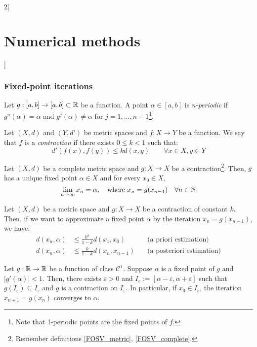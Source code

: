\documentclass[../../../main.tex]{subfiles}
\begin{document}
\begin{multicols}{2}[\section{Numerical methods}]
    \subsubsection*{Fixed-point iterations}
    \begin{definition}
        Let $g:[a,b]\rightarrow[a,b]\subset\mathbb{R}$ be a function. A point $\alpha\in[a,b]$ is \textit{n-periodic} if $g^n(\alpha)=\alpha$ and $g^j(\alpha)\ne\alpha$ for $j=1,\ldots,n-1$\footnote{Note that 1-periodic points are the fixed points of $f$.}.
    \end{definition}
    \begin{definition}
        Let $(X,d)$ and $(Y,d')$  be metric spaces and $f:X\rightarrow Y$ be a function. We say that $f$ is a \textit{contraction} if there exists $0\leq k<1$ such that: $$d'(f(x),f(y))\leq kd(x,y)\qquad\forall x\in X,y\in Y$$
    \end{definition}
    \begin{theorem}
        Let $(X,d)$ be a complete metric space and $g:X\rightarrow X$ be a contraction\footnote{Remember definitions \ref{FOSV_metric}, \ref{FOSV_complete}.}. Then, $g$ has a unique fixed point $\alpha\in X$ and for every $x_0\in X$, $$\lim_{n\to\infty}x_n=\alpha,\quad\text{where }x_n=g(x_{n-1})\quad\forall n\in\mathbb{N}$$
    \end{theorem}
    \begin{prop}
        Let $(X,d)$ be a metric space and $g:X\rightarrow X$ be a contraction of constant $k$. Then, if we want to approximate a fixed point $\alpha$ by the iteration $x_n=g(x_{n-1})$, we have:
        \begin{align*}
            d(x_n,\alpha) & \leq\frac{k^n}{1-k}d(x_1,x_0)\quad   & \text{(a priori estimation)}     \\
            d(x_n,\alpha) & \leq\frac{k}{1-k}d(x_n,x_{n-1})\quad & \text{(a posteriori estimation)}
        \end{align*}
    \end{prop}
    \begin{corollary}
        Let $g:\mathbb{R}\rightarrow\mathbb{R}$ be a function of class $\mathcal{C}^1$. Suppose $\alpha$ is a fixed point of $g$ and $|g'(\alpha)|<1$. Then, there exists $\varepsilon>0$ and $I_\varepsilon:=[\alpha-\varepsilon,\alpha+\varepsilon]$ such that $g(I_\varepsilon)\subseteq I_\varepsilon$ and $g$ is a contraction on $I_\varepsilon$. In particular, if $x_0\in I_\varepsilon$, the iteration $x_{n+1}=g(x_n)$ converges to $\alpha$.
    \end{corollary}

\end{multicols}
\end{document}
